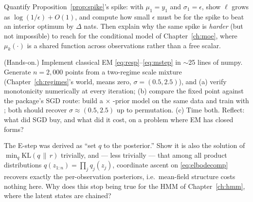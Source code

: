 \begin{exercise}\label{ex:4-spike}
Quantify Proposition~\ref{prop:spike}'s spike: with $\mu_1 = y_1$ and
$\sigma_1 = \epsilon$, show $\ell$ grows as $\log(1/\epsilon) + O(1)$, and
compute how small $\epsilon$ must be for the spike to beat an interior
optimum by $\Delta$ nats. Then explain why the same spike is
\emph{harder} (but not impossible) to reach for the conditional model of
Chapter~\ref{ch:moe}, where $\mu_k(\cdot)$ is a shared function across
observations rather than a free scalar.
\end{exercise}

\begin{exercise}\label{ex:4-numpy}
(Hands-on.) Implement classical EM \eqref{eq:resp}--\eqref{eq:mstep} in
$\sim$25 lines of numpy. Generate $n = 2{,}000$ points from a two-regime
scale mixture (Chapter~\ref{ch:regimes}'s world, means zero,
$\sigma = (0.5, 2.5)$), and (a) verify monotonicity numerically at every
iteration; (b) compare the fixed point against the package's SGD route:
build a  $\times$ -prior
model on the same data and train with ; both should
recover $\sigma \approx (0.5, 2.5)$ up to permutation. (c) Time both.
Reflect: what did SGD buy, and what did it cost, on a problem where EM has
closed forms?
\end{exercise}

\begin{exercise}\label{ex:4-kl}
The E-step was derived as ``set $q$ to the posterior.'' Show it is also
the solution of $\min_q \mathrm{KL}(q \,\|\, r)$ trivially, and --- less
trivially --- that among all product distributions $q(z_{1:n}) = \prod_j
q_j(z_j)$, coordinate ascent on \eqref{eq:elbodecomp} recovers exactly the
per-observation posteriors, i.e.\ mean-field structure costs nothing here.
Why does this stop being true for the HMM of Chapter~\ref{ch:hmm}, where
the latent states are chained?
\end{exercise}

